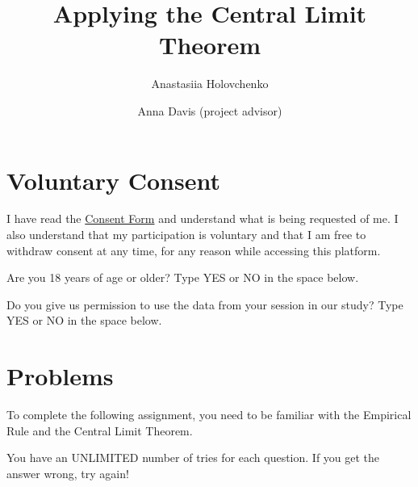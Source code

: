 \documentclass{ximera}
\author{Anastasiia Holovchenko \and Anna Davis (project advisor)} \title{Applying the Central Limit Theorem}
\begin{document}
\begin{abstract}
\end{abstract}
\maketitle


\section{Voluntary Consent} 
I have read the \href{https://ximera.osu.edu/statproj/CLTtoHT/consent/main}{Consent Form} and understand what is being requested of me.  I also understand that my participation is voluntary and that I am free to withdraw consent at any time, for any reason while accessing this platform.

 \begin{question} 
Are you 18 years of age or older? Type YES or NO in the space below.  
\begin{freeResponse}  
\end{freeResponse}  
\end{question}

\begin{question}  
Do you give us permission to use the data from your session in our study?  Type YES or NO in the space below. 
\begin{freeResponse}  
\end{freeResponse}  
\end{question}

\section{Problems}
To complete the following assignment, you need to be familiar with the Empirical Rule and the Central Limit Theorem.

{\color{red}You have an UNLIMITED number of tries for each question.  If you get the answer wrong, try again!}
\end{document}
